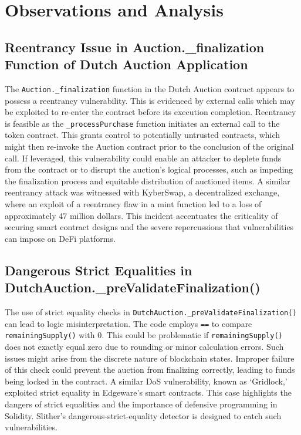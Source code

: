 \documentclass[conference]{IEEEtran}
\begin{document}
\section{Observations and Analysis}

\subsection{Reentrancy Issue in Auction.\_finalization Function of Dutch Auction Application}
The \texttt{Auction.\_finalization} function in the Dutch Auction contract appears to possess a reentrancy vulnerability. This is evidenced by external calls which may be exploited to re-enter the contract before its execution completion. Reentrancy is feasible as the \texttt{\_processPurchase} function initiates an external call to the token contract. This grants control to potentially untrusted contracts, which might then re-invoke the Auction contract prior to the conclusion of the original call. If leveraged, this vulnerability could enable an attacker to deplete funds from the contract or to disrupt the auction's logical processes, such as impeding the finalization process and equitable distribution of auctioned items. A similar reentrancy attack was witnessed with KyberSwap, a decentralized exchange, where an exploit of a reentrancy flaw in a mint function led to a loss of approximately 47 million dollars. This incident accentuates the criticality of securing smart contract designs and the severe repercussions that vulnerabilities can impose on DeFi platforms. \cite{kyberswap2023hack}

\subsection{Dangerous Strict Equalities in DutchAuction.\_preValidateFinalization()}
The use of strict equality checks in \texttt{DutchAuction.\_preValidateFinalization()} can lead to logic misinterpretation. The code employs \texttt{==} to compare \texttt{remainingSupply()} with 0. This could be problematic if \texttt{remainingSupply()} does not exactly equal zero due to rounding or minor calculation errors. Such issues might arise from the discrete nature of blockchain states. Improper failure of this check could prevent the auction from finalizing correctly, leading to funds being locked in the contract. A similar DoS vulnerability, known as ‘Gridlock,’ exploited strict equality in Edgeware's smart contracts. This case highlights the dangers of strict equalities and the importance of defensive programming in Solidity. Slither’s dangerous-strict-equality detector is designed to catch such vulnerabilities\cite{trailofbits2019gridlock}.
\end{document}
